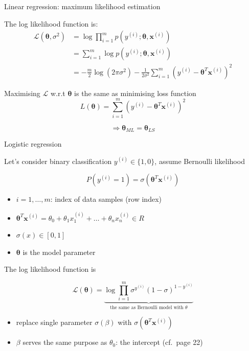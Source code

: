\documentclass[ignorenonframetext,]{beamer}
\providecommand{\tightlist}{%
  \setlength{\itemsep}{0pt}\setlength{\parskip}{0pt}}
\newcommand{\vv}[1]{\boldsymbol{#1}}
\newcommand{\di}[2]{\ensuremath{ #1^{(#2)}}}
\begin{document}
\begin{frame}{Linear regression: maximum likelihood estimation}
\protect\hypertarget{linear-regression-maximum-likelihood-estimation}{}

The log likelihood function is: \begin{align*}
\mathcal{L}(\vv{\theta}, \sigma^2) &= \log \prod_{i=1}^m p(\di{y}{i};\vv{\theta},\di{\vv{x}}{i}) \\
&= \sum_{i=1}^m \log p(\di{y}{i};\vv{\theta},\di{\vv{x}}{i}) \\
&= -\frac{m}{2}\log(2\pi\sigma^2) - \frac{1}{2\sigma^2}\sum_{i=1}^m (\di{y}{i} - \vv{\theta}^T\di{\vv{x}}{i})^2
\end{align*}

\bigskip

Maximising \(\mathcal{L}\) w.r.t \(\vv{\theta}\) is the same as
minimising loss function
\[L(\vv{\theta})=\sum_{i=1}^m (\di{y}{i} - \vv{\theta}^T\di{\vv{x}}{i})^2\]

\[\Rightarrow \vv{\theta}_{ML} = \vv{\theta}_{LS}\]

\end{frame}

\begin{frame}{Logistic regression}
\protect\hypertarget{logistic-regression}{}

Let's consider binary classification \(\di{y}{i} \in \{1,0\}\), assume
Bernoulli likelihood

\[P(y^{(i)}=1) = \sigma\left (\vv{\theta}^T\vv{x}^{(i)}\right )\]

\begin{itemize}
\tightlist
\item
  \(i = 1,\ldots,m\): index of data samples (row index)
\item
  \(\vv{\theta}^T\di{\vv{x}}{i}= \theta_0 + \theta_1\di{x_1}{i}+\ldots+ \theta_n\di{x_n}{i}\in R\)
\item
  \(\sigma(x) \in [0,1]\)
\item
  \(\vv{\theta}\) is the model parameter
\end{itemize}

The log likelihood function is

\[\mathcal{L}(\vv{\theta}) = \underbrace{\log \prod_{i=1}^m \sigma^{\di{y}{i}} (1-\sigma)^{1-\di{y}{i}}}_{\text{the same as Bernoulli model with } \theta}\]

\begin{itemize}
\tightlist
\item
  replace single parameter \(\sigma(\beta)\) with
  \(\sigma(\vv{\theta}^T\di{\vv{x}}{i})\)
\item
  \(\beta\) serves the same purpose as \(\theta_0\): the intercept
  (cf.~page 22)
\end{itemize}

\end{frame}
\end{document}
